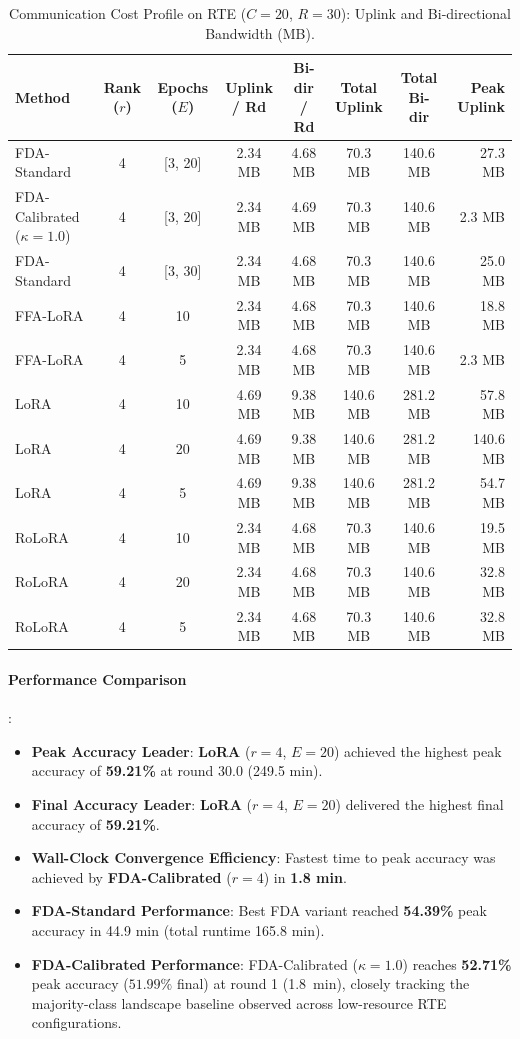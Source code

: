 \documentclass[10pt,a4paper]{article}
\begin{document}
\begin{table}[H]
\centering
\caption{Communication Cost Profile on RTE ($C=20$, $R=30$): Uplink and Bi-directional Bandwidth (MB).}
\scriptsize
\setlength{\tabcolsep}{4.0pt}
\begin{tabular*}{\textwidth}{@{\extracolsep{\fill}}lccccccr@{}}
\toprule
\textbf{Method} & \textbf{Rank ($r$)} & \textbf{Epochs ($E$)} & \textbf{Uplink / Rd} & \textbf{Bi-dir / Rd} & \textbf{Total Uplink} & \textbf{Total Bi-dir} & \textbf{Peak Uplink} \\
\midrule
FDA-Standard & 4 & [3, 20] & 2.34 MB & 4.68 MB & 70.3 MB & 140.6 MB & 27.3 MB \\
FDA-Calibrated ($\kappa=1.0$) & 4 & [3, 20] & 2.34 MB & 4.69 MB & 70.3 MB & 140.6 MB & 2.3 MB \\
FDA-Standard & 4 & [3, 30] & 2.34 MB & 4.68 MB & 70.3 MB & 140.6 MB & 25.0 MB \\
FFA-LoRA & 4 & 10 & 2.34 MB & 4.68 MB & 70.3 MB & 140.6 MB & 18.8 MB \\
FFA-LoRA & 4 & 5 & 2.34 MB & 4.68 MB & 70.3 MB & 140.6 MB & 2.3 MB \\
LoRA & 4 & 10 & 4.69 MB & 9.38 MB & 140.6 MB & 281.2 MB & 57.8 MB \\
LoRA & 4 & 20 & 4.69 MB & 9.38 MB & 140.6 MB & 281.2 MB & 140.6 MB \\
LoRA & 4 & 5 & 4.69 MB & 9.38 MB & 140.6 MB & 281.2 MB & 54.7 MB \\
RoLoRA & 4 & 10 & 2.34 MB & 4.68 MB & 70.3 MB & 140.6 MB & 19.5 MB \\
RoLoRA & 4 & 20 & 2.34 MB & 4.68 MB & 70.3 MB & 140.6 MB & 32.8 MB \\
RoLoRA & 4 & 5 & 2.34 MB & 4.68 MB & 70.3 MB & 140.6 MB & 32.8 MB \\
\bottomrule
\end{tabular*}
\end{table}

\paragraph{Performance Comparison}:
\begin{itemize}
    \item \textbf{Peak Accuracy Leader}: \textbf{LoRA} ($r=4$, $E=20$) achieved the highest peak accuracy of \textbf{59.21\%} at round 30.0 (249.5 min).
    \item \textbf{Final Accuracy Leader}: \textbf{LoRA} ($r=4$, $E=20$) delivered the highest final accuracy of \textbf{59.21\%}.
    \item \textbf{Wall-Clock Convergence Efficiency}: Fastest time to peak accuracy was achieved by \textbf{FDA-Calibrated} ($r=4$) in \textbf{1.8 min}.
    \item \textbf{FDA-Standard Performance}: Best FDA variant reached \textbf{54.39\%} peak accuracy in 44.9 min (total runtime 165.8 min).
    \item \textbf{FDA-Calibrated Performance}: FDA-Calibrated ($\kappa=1.0$) reaches \textbf{52.71\%} peak accuracy ($51.99\%$ final) at round 1 (1.8~min), closely tracking the majority-class landscape baseline observed across low-resource RTE configurations.
\end{itemize}
\end{document}
